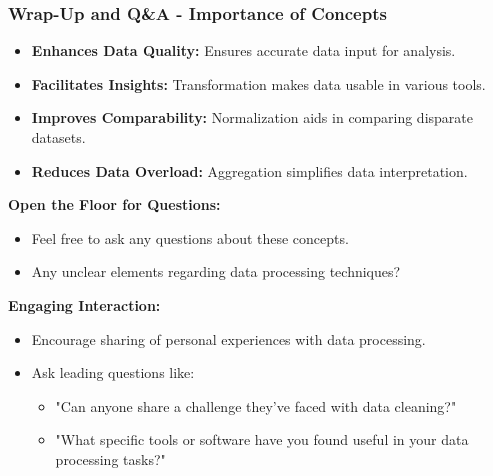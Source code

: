 \documentclass[aspectratio=169]{beamer}
\begin{document}
\begin{frame}[fragile]
    \frametitle{Wrap-Up and Q\&A - Importance of Concepts}
    \begin{itemize}
        \item \textbf{Enhances Data Quality:} Ensures accurate data input for analysis.
        \item \textbf{Facilitates Insights:} Transformation makes data usable in various tools.
        \item \textbf{Improves Comparability:} Normalization aids in comparing disparate datasets.
        \item \textbf{Reduces Data Overload:} Aggregation simplifies data interpretation.
    \end{itemize}
    
    \bigskip
    \textbf{Open the Floor for Questions:}
    \begin{itemize}
        \item Feel free to ask any questions about these concepts.
        \item Any unclear elements regarding data processing techniques?
    \end{itemize}
    
    \textbf{Engaging Interaction:}
    \begin{itemize}
        \item Encourage sharing of personal experiences with data processing.
        \item Ask leading questions like: 
        \begin{itemize}
            \item "Can anyone share a challenge they've faced with data cleaning?"
            \item "What specific tools or software have you found useful in your data processing tasks?"
        \end{itemize}
    \end{itemize}
\end{frame}
\end{document}
